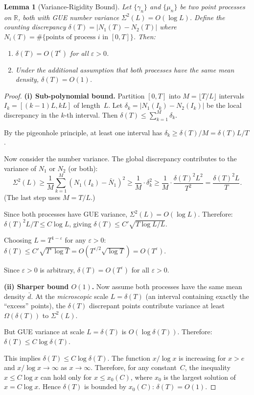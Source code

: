 \documentclass[11pt,a4paper]{article}
\theoremstyle{plain}
\newtheorem{lemma}[theorem]{Lemma}
\theoremstyle{remark}
\newcommand{\R}{\mathbb{R}}
\begin{document}
\begin{lemma}[Variance-Rigidity Bound]\label{lem:variance-rigidity}
Let $\{\gamma_n\}$ and $\{\mu_n\}$ be two point processes on $\R$, both
with GUE number variance $\Sigma^2(L)=O(\log L)$.  Define the
\emph{counting discrepancy}
$\delta(T)=|N_1(T)-N_2(T)|$ where $N_i(T)=\#\{\text{points of process }i
\text{ in }[0,T]\}$.  Then:
\begin{enumerate}[nosep,label=(\roman*)]
  \item $\delta(T)=O(T^\varepsilon)$ for all $\varepsilon>0$.
  \item Under the additional assumption that both processes have the same
        mean density, $\delta(T)=O(1)$.
\end{enumerate}
\end{lemma}

\begin{proof}
\textbf{(i) Sub-polynomial bound.}
Partition $[0,T]$ into $M=\lfloor T/L\rfloor$ intervals
$I_k=[(k-1)L,kL]$ of length~$L$.  Let $\delta_k=|N_1(I_k)-N_2(I_k)|$
be the local discrepancy in the $k$-th interval.  Then
$\delta(T)\leq\sum_{k=1}^M\delta_k$.

By the pigeonhole principle, at least one interval has
$\delta_k\geq\delta(T)/M=\delta(T)L/T$.

Now consider the number variance.  The global discrepancy contributes
to the variance of $N_1$ or $N_2$ (or both):
\[
  \Sigma^2(L)\geq\frac{1}{M}\sum_{k=1}^M(N_1(I_k)-\bar{N}_1)^2
  \geq\frac{1}{M}\cdot\delta_k^2\geq\frac{1}{M}\cdot\frac{\delta(T)^2 L^2}{T^2}
  =\frac{\delta(T)^2 L}{T}.
\]
(The last step uses $M=T/L$.)

Since both processes have GUE variance, $\Sigma^2(L)=O(\log L)$.
Therefore: $\delta(T)^2 L/T\leq C\log L$, giving
$\delta(T)\leq C'\sqrt{T\log L/L}$.

Choosing $L=T^{1-\varepsilon}$ for any $\varepsilon>0$:
$\delta(T)\leq C'\sqrt{T^{\varepsilon}\log T}=O(T^{\varepsilon/2}\sqrt{\log T})
=O(T^\varepsilon)$.

Since $\varepsilon>0$ is arbitrary, $\delta(T)=O(T^\varepsilon)$ for all
$\varepsilon>0$.

\textbf{(ii) Sharper bound $O(1)$.}
Now assume both processes have the same mean density $\bar{d}$.  At the
\emph{microscopic} scale $L=\delta(T)$ (an interval containing exactly
the ``excess'' points), the $\delta(T)$ discrepant points contribute
variance at least $\Omega(\delta(T))$ to $\Sigma^2(L)$.

But GUE variance at scale $L=\delta(T)$ is $O(\log\delta(T))$.  Therefore:
$\delta(T)\leq C\log\delta(T)$.

This implies $\delta(T)\leq C\log\delta(T)$.  The function
$x/\log x$ is increasing for $x>e$ and $x/\log x\to\infty$ as
$x\to\infty$.  Therefore, for any constant~$C$, the inequality
$x\leq C\log x$ can hold only for $x\leq x_0(C)$, where $x_0$
is the largest solution of $x=C\log x$.  Hence $\delta(T)$ is
bounded by $x_0(C)$: $\delta(T)=O(1)$.
\end{proof}
\end{document}
